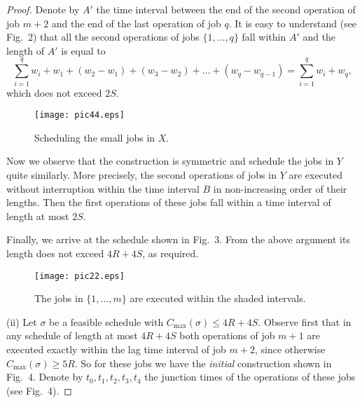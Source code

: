 \documentclass[12pt,a4paper]{article}
\begin{document}
\begin{proof}
Denote by $A'$ the time interval between the end of the second
operation of job $m+2$ and the end of the last operation of job $q$.
It is easy to understand (see Fig.~2) that all the second operations
of jobs $\{1,\ldots , q\}$ fall within $A'$ and the length of $A'$
is equal to
$$\sum_{i=1}^q w_i+w_1
+(w_2-w_1)+(w_3-w_2)+\ldots+(w_q-w_{q-1})= \sum_{i=1}^q w_i+w_q,$$
which does not exceed $2S$.
\begin{figure}[h]
\vspace{1mm}
\begin{center}
\texttt{[image: pic44.eps]}
  \caption{Scheduling the small jobs in $X$.}
\end{center}
\end{figure}
Now we observe that the construction is symmetric and schedule the
jobs in $Y$ quite similarly. More precisely, the second operations
of jobs in $Y$ are executed without interruption within the time
interval $B$ in non-increasing order of their lengths. Then the
first operations of these jobs fall within a time interval of length
at most $2S$.

Finally, we arrive at the schedule shown in Fig.~3. From the above
argument its length does not exceed $4R+4S$, as required.
\begin{figure}[h]
\vspace{1mm}
\begin{center}
\texttt{[image: pic22.eps]}
  \caption{The jobs in $\{1,\ldots, m\}$ are executed
within the shaded intervals.}
\end{center}
\end{figure}


(ii) Let $\sigma$ be a feasible schedule with $C_{\max}(\sigma) \leq
4R+4S$. Observe first that in any schedule of length at most $4R+4S$
both operations of job $m+1$ are executed exactly within the lag
time interval of job $m+2$, since otherwise $C_{\max}(\sigma) \geq
5R$. So for these jobs we have the \emph{initial} construction shown
in Fig.~4. Denote by $t_0, t_1, t_2, t_3, t_4$ the junction times of
the operations of these jobs (see Fig.~4).


\end{proof}
\end{document}
